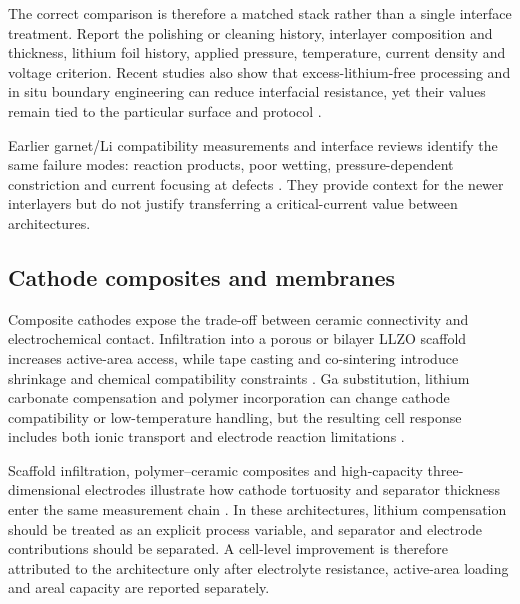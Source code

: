 The correct comparison is therefore a matched stack rather than a single interface treatment. Report the polishing or cleaning history, interlayer composition and thickness, lithium foil history, applied pressure, temperature, current density and voltage criterion. Recent studies also show that excess-lithium-free processing and in situ boundary engineering can reduce interfacial resistance, yet their values remain tied to the particular surface and protocol \cite{nasir2025excess,you2025in,zhang2024an,jiang2024homogenizing}.

Earlier garnet/Li compatibility measurements and interface reviews identify the same failure modes: reaction products, poor wetting, pressure-dependent constriction and current focusing at defects \cite{kotobuki2010compatibility,fingerle2017evidence,krauskopf2020physicochemical,gupta2020analyzing,banerjee2020interfaces,kim2020solid,du2019recent,lee2025solid,cao2025solid,hara2026roles}. They provide context for the newer interlayers but do not justify transferring a critical-current value between architectures.

\subsection{Cathode composites and membranes}

Composite cathodes expose the trade-off between ceramic connectivity and electrochemical contact. Infiltration into a porous or bilayer LLZO scaffold increases active-area access, while tape casting and co-sintering introduce shrinkage and chemical compatibility constraints \cite{zhang2023bilayer,finsterbusch2018high,go2026developing,touidjine2026tape,zubair2026high}. Ga substitution, lithium carbonate compensation and polymer incorporation can change cathode compatibility or low-temperature handling, but the resulting cell response includes both ionic transport and electrode reaction limitations \cite{roitzheim2026fully,lu2021modified,ren2022oxide,touidjine2024the,seo2020broad}.

Scaffold infiltration, polymer--ceramic composites and high-capacity three-dimensional electrodes illustrate how cathode tortuosity and separator thickness enter the same measurement chain \cite{yan2020submicron,li2023a,song2020progress,fan2021tailoring,yu2020a,finsterbusch2018high,zhang2024advancements,kumchompoo2026lifepo4,zheng2026interfacial}. In these architectures, lithium compensation should be treated as an explicit process variable, and separator and electrode contributions should be separated. A cell-level improvement is therefore attributed to the architecture only after electrolyte resistance, active-area loading and areal capacity are reported separately.


